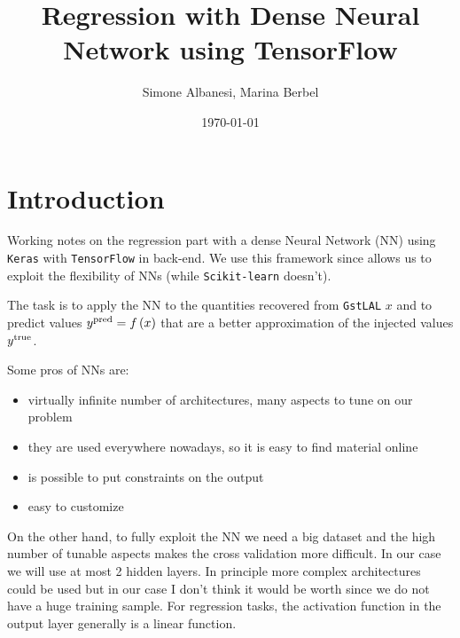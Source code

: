 \documentclass[prd,aps,twocolumn,a4paper,showkeys,nofootinbib]{revtex4-1}
\begin{document}
\title{Regression with Dense Neural Network using TensorFlow}

\author{Simone Albanesi, Marina Berbel}

\date{\today}

\maketitle

\section{Introduction}
Working notes on the regression part with a dense Neural Network (NN)
using \texttt{Keras} with \texttt{TensorFlow} in back-end. We use this framework since allows us to
exploit the flexibility of NNs (while \texttt{Scikit-learn} doesn't).

The task is to apply the NN to the quantities recovered from \texttt{GstLAL} $x$ and to predict
values $y^{\rm pred} = f\left( x \right)$ that are a better approximation of the injected 
values $y^{\rm true}$.

Some pros of NNs are:
\begin{itemize}
\item virtually infinite number of architectures, many aspects to tune on our problem 
\item they are used everywhere nowadays, so it is easy to find material online
\item is possible to put constraints on the output
\item easy to customize
\end{itemize}
On the other hand, to fully exploit the NN we need a big dataset and the high number of tunable
aspects makes the cross validation more difficult. In our case we will use at most 2 hidden layers.
In principle more complex architectures could  be used but in our case 
I don't think it would be worth since we do not have a huge training sample. 
For regression tasks, the activation function in the output layer generally is a linear function.
\end{document}
